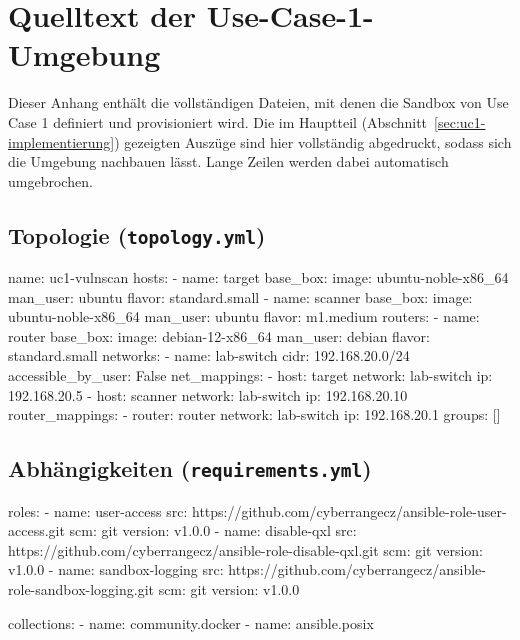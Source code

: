 \chapter{Quelltext der Use-Case-1-Umgebung}
\label{chap:quelltext-uc1}

Dieser Anhang enthält die vollständigen Dateien, mit denen die Sandbox von Use Case 1 definiert und
provisioniert wird. Die im Hauptteil (Abschnitt~\ref{sec:uc1-implementierung}) gezeigten Auszüge
sind hier vollständig abgedruckt, sodass sich die Umgebung nachbauen lässt. Lange Zeilen werden dabei
automatisch umgebrochen.

\section{Topologie (\texttt{topology.yml})}

\begin{GenericCode}
name: uc1-vulnscan
hosts:
  - name: target
    base_box:
      image: ubuntu-noble-x86_64
      man_user: ubuntu
    flavor: standard.small
  - name: scanner
    base_box:
      image: ubuntu-noble-x86_64
      man_user: ubuntu
    flavor: m1.medium
routers:
  - name: router
    base_box:
      image: debian-12-x86_64
      man_user: debian
    flavor: standard.small
networks:
  - name: lab-switch
    cidr: 192.168.20.0/24
    accessible_by_user: False
net_mappings:
  - host: target
    network: lab-switch
    ip: 192.168.20.5
  - host: scanner
    network: lab-switch
    ip: 192.168.20.10
router_mappings:
  - router: router
    network: lab-switch
    ip: 192.168.20.1
groups: []
\end{GenericCode}

\section{Abhängigkeiten (\texttt{requirements.yml})}

\begin{GenericCode}
roles:
  - name: user-access
    src: https://github.com/cyberrangecz/ansible-role-user-access.git
    scm: git
    version: v1.0.0
  - name: disable-qxl
    src: https://github.com/cyberrangecz/ansible-role-disable-qxl.git
    scm: git
    version: v1.0.0
  - name: sandbox-logging
    src: https://github.com/cyberrangecz/ansible-role-sandbox-logging.git
    scm: git
    version: v1.0.0

collections:
  - name: community.docker
  - name: ansible.posix
\end{GenericCode}


